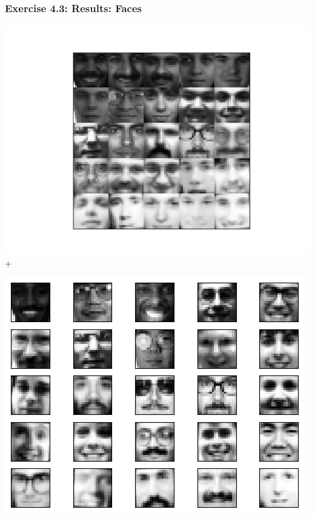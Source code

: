 \documentclass[10pt,aspectratio=169,handout]{beamer}
\begin{document}
\begin{frame}
    \frametitle{Exercise 4.3: Results: Faces}

    \begin{minipage}{0.49\textwidth}
        \includegraphics[width=\textwidth]{images/4-3_faces_25.png}+
    \end{minipage}
    \begin{minipage}{0.49\textwidth}
        \includegraphics[width=\textwidth]{images/faces_adrian.png}
    \end{minipage}
    
\end{frame}
\end{document}
